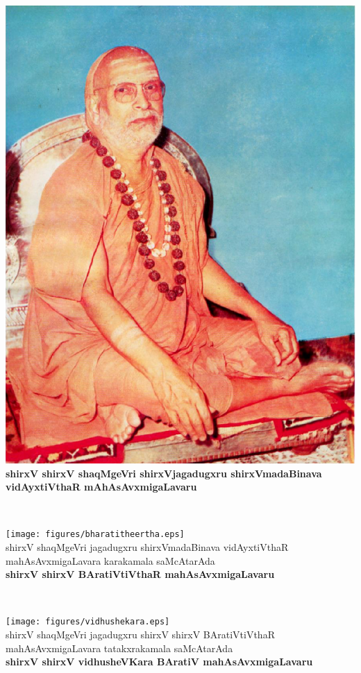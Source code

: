 \begin{center}
\vfill
\thispagestyle{empty}
\includegraphics{figures/abhinava_v_t.eps}\\
{\bf shirxV shirxV shaqMgeVri shirxVjagadugxru shirxVmadaBinava\\ vidAyxtiVthaR mAhAsAvxmigaLavaru}
\vfill
\end{center}
\newpage
~\thispagestyle{empty}
\newpage
\begin{center}
\vfill
\thispagestyle{empty}
\texttt{[image: figures/bharatitheertha.eps]}\\
shirxV shaqMgeVri jagadugxru  shirxVmadaBinava vidAyxtiVthaR\\ mahAsAvxmigaLavara karakamala saMcAtarAda\\ 
{\bf shirxV shirxV BAratiVtiVthaR mahAsAvxmigaLavaru}
\vfill
\end{center}
\newpage
~\thispagestyle{empty}
\newpage
\begin{center}
\vfill
\thispagestyle{empty}
\texttt{[image: figures/vidhushekara.eps]}\\
shirxV shaqMgeVri jagadugxru shirxV shirxV BAratiVtiVthaR\\ mahAsAvxmigaLavara tatakxrakamala saMcAtarAda\\ 
{\bf shirxV shirxV vidhusheVKara BAratiV mahAsAvxmigaLavaru}
\vfill
\end{center}

